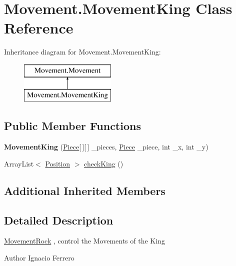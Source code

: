 \hypertarget{class_movement_1_1_movement_king}{\section{Movement.\-Movement\-King Class Reference}
\label{class_movement_1_1_movement_king}
}
Inheritance diagram for Movement.\-Movement\-King\-:\begin{figure}[H]
\begin{center}
\leavevmode
\includegraphics[height=2.000000cm]{class_movement_1_1_movement_king}
\end{center}
\end{figure}
\subsection*{Public Member Functions}
\begin{DoxyCompactItemize}
\item 
\hypertarget{class_movement_1_1_movement_king_a3d79b75a37bc641cb0187220baa83b66}{{\bfseries Movement\-King} (\hyperlink{class_basic___objects_1_1_piece}{Piece}\mbox{[}$\,$\mbox{]}\mbox{[}$\,$\mbox{]} \-\_\-pieces, \hyperlink{class_basic___objects_1_1_piece}{Piece} \-\_\-piece, int \-\_\-x, int \-\_\-y)}\label{class_movement_1_1_movement_king_a3d79b75a37bc641cb0187220baa83b66}

\item 
Array\-List$<$ \hyperlink{class_basic___objects_1_1_position}{Position} $>$ \hyperlink{class_movement_1_1_movement_king_a0ccce7ab8396ee16caf582795f04241f}{check\-King} ()
\end{DoxyCompactItemize}
\subsection*{Additional Inherited Members}


\subsection{Detailed Description}
\hyperlink{class_movement_1_1_movement_rock}{Movement\-Rock} , control the Movements of the King \begin{DoxyAuthor}{Author}
Ignacio Ferrero 
\end{DoxyAuthor}


